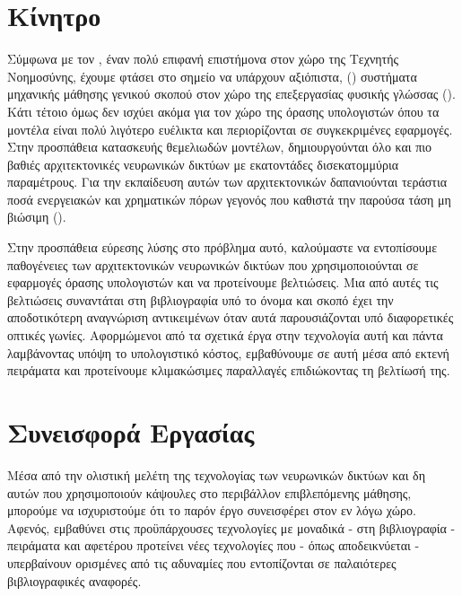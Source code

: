 \section{Κίνητρο}
Σύμφωνα με τον , έναν πολύ επιφανή επιστήμονα στον χώρο της Τεχνητής Νοημοσύνης, έχουμε φτάσει στο σημείο να υπάρχουν αξιόπιστα,  () συστήματα μηχανικής μάθησης γενικού σκοπού στον χώρο της επεξεργασίας φυσικής γλώσσας (). Κάτι τέτοιο όμως δεν ισχύει ακόμα για τον χώρο της όρασης υπολογιστών όπου τα μοντέλα είναι πολύ λιγότερο ευέλικτα και περιορίζονται σε συγκεκριμένες εφαρμογές\cite{anadiotis_2022}. Στην προσπάθεια κατασκευής θεμελιωδών μοντέλων, δημιουργούνται όλο και πιο βαθιές αρχιτεκτονικές νευρωνικών δικτύων με εκατοντάδες δισεκατομμύρια παραμέτρους. Για την εκπαίδευση αυτών των αρχιτεκτονικών δαπανιούνται τεράστια ποσά ενεργειακών και χρηματικών πόρων γεγονός που καθιστά την παρούσα τάση μη βιώσιμη ().\par 
Στην προσπάθεια εύρεσης λύσης στο πρόβλημα αυτό, καλούμαστε να εντοπίσουμε παθογένειες των αρχιτεκτονικών νευρωνικών δικτύων που χρησιμοποιούνται σε εφαρμογές όρασης υπολογιστών και να προτείνουμε βελτιώσεις. Μια από αυτές τις βελτιώσεις συναντάται στη βιβλιογραφία υπό το όνομα  και σκοπό έχει την αποδοτικότερη αναγνώριση αντικειμένων όταν αυτά παρουσιάζονται υπό διαφορετικές οπτικές γωνίες. Αφορμώμενοι από τα σχετικά έργα στην τεχνολογία αυτή και πάντα λαμβάνοντας υπόψη το υπολογιστικό κόστος, εμβαθύνουμε σε αυτή μέσα από εκτενή πειράματα και προτείνουμε κλιμακώσιμες παραλλαγές επιδιώκοντας τη βελτίωσή της.

\section{Συνεισφορά Εργασίας}
Μέσα από την ολιστική μελέτη της τεχνολογίας των νευρωνικών δικτύων και δη αυτών που χρησιμοποιούν κάψουλες στο περιβάλλον επιβλεπόμενης μάθησης, μπορούμε να ισχυριστούμε ότι το παρόν έργο συνεισφέρει στον εν λόγω χώρο. Αφενός, εμβαθύνει στις προϋπάρχουσες τεχνολογίες με μοναδικά - στη βιβλιογραφία - πειράματα και αφετέρου προτείνει νέες τεχνολογίες που - όπως αποδεικνύεται - υπερβαίνουν ορισμένες από τις αδυναμίες που εντοπίζονται σε παλαιότερες βιβλιογραφικές αναφορές.\par

